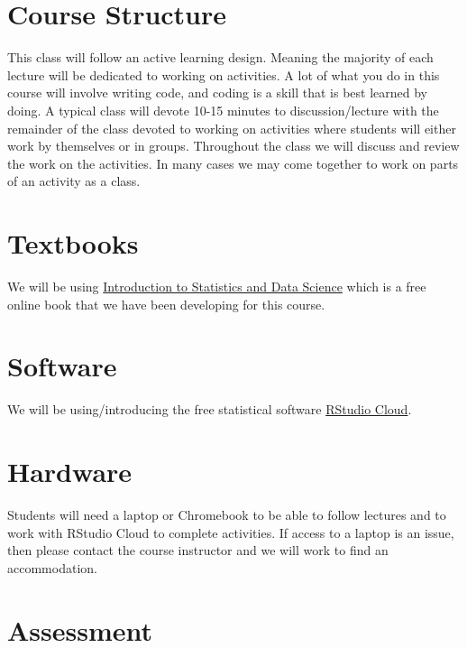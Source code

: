 \documentclass[
  letterpaper,
  DIV=11,
  numbers=noendperiod]{scrreprt}
\begin{document}
\hypertarget{course-structure}{%
\section*{Course Structure}\label{course-structure}}

This class will follow an active learning design. Meaning the majority
of each lecture will be dedicated to working on activities. A lot of
what you do in this course will involve writing code, and coding is a
skill that is best learned by doing. A typical class will devote 10-15
minutes to discussion/lecture with the remainder of the class devoted to
working on activities where students will either work by themselves or
in groups. Throughout the class we will discuss and review the work on
the activities. In many cases we may come together to work on parts of
an activity as a class.

\hypertarget{textbooks}{%
\section*{Textbooks}\label{textbooks}}

We will be using
\href{https://nustat.github.io/intro-stat-ds/}{Introduction to
Statistics and Data Science} which is a free online book that we have
been developing for this course.

\hypertarget{software}{%
\section*{Software}\label{software}}

We will be using/introducing the free statistical software
\href{https://rstuido.cloud/}{RStudio Cloud}.

\hypertarget{hardware}{%
\section*{Hardware}\label{hardware}}

Students will need a laptop or Chromebook to be able to follow lectures
and to work with RStudio Cloud to complete activities. If access to a
laptop is an issue, then please contact the course instructor and we
will work to find an accommodation.

\hypertarget{assessment}{%
\section*{Assessment}\label{assessment}}
\end{document}
